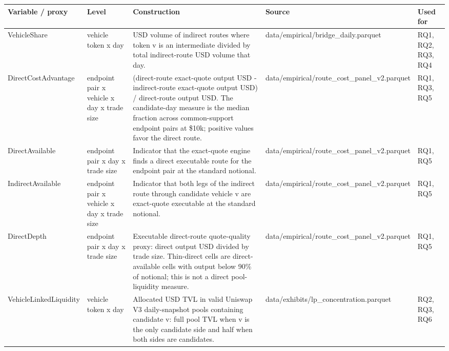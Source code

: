 \begin{tabularx}{\linewidth}{@{}>{\raggedright\arraybackslash}X>{\raggedright\arraybackslash}X>{\raggedright\arraybackslash}X>{\raggedright\arraybackslash}X>{\raggedright\arraybackslash}X@{}}
\toprule
Variable / proxy & Level & Construction & Source & Used for \\
\midrule
VehicleShare & vehicle token x day & USD volume of indirect routes where token v is an intermediate divided by total indirect-route USD volume that day. & data/\allowbreak{}empirical/\allowbreak{}bridge\_\allowbreak{}daily.parquet & RQ1, RQ2, RQ3, RQ4 \\
DirectCostAdvantage & endpoint pair x vehicle x day x trade size & (direct-route exact-quote output USD - indirect-route exact-quote output USD) /\allowbreak{} direct-route output USD. The candidate-day measure is the median fraction across common-support endpoint pairs at \$10k; positive values favor the direct route. & data/\allowbreak{}empirical/\allowbreak{}route\_\allowbreak{}cost\_\allowbreak{}panel\_\allowbreak{}v2.parquet & RQ1, RQ3, RQ5 \\
DirectAvailable & endpoint pair x day x trade size & Indicator that the exact-quote engine finds a direct executable route for the endpoint pair at the standard notional. & data/\allowbreak{}empirical/\allowbreak{}route\_\allowbreak{}cost\_\allowbreak{}panel\_\allowbreak{}v2.parquet & RQ1, RQ5 \\
IndirectAvailable & endpoint pair x vehicle x day x trade size & Indicator that both legs of the indirect route through candidate vehicle v are exact-quote executable at the standard notional. & data/\allowbreak{}empirical/\allowbreak{}route\_\allowbreak{}cost\_\allowbreak{}panel\_\allowbreak{}v2.parquet & RQ1, RQ5 \\
DirectDepth & endpoint pair x day x trade size & Executable direct-route quote-quality proxy: direct output USD divided by trade size. Thin-direct cells are direct-available cells with output below 90\% of notional; this is not a direct pool-liquidity measure. & data/\allowbreak{}empirical/\allowbreak{}route\_\allowbreak{}cost\_\allowbreak{}panel\_\allowbreak{}v2.parquet & RQ1, RQ5 \\
VehicleLinkedLiquidity & vehicle token x day & Allocated USD TVL in valid Uniswap V3 daily-snapshot pools containing candidate v: full pool TVL when v is the only candidate side and half when both sides are candidates. & data/\allowbreak{}exhibits/\allowbreak{}lp\_\allowbreak{}concentration.parquet & RQ2, RQ3, RQ6 \\

\end{tabularx}
